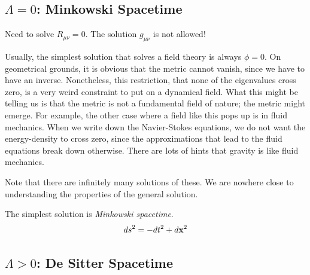 \subsection{\texorpdfstring{$\Lambda = 0$}{Zero cosmological constant}: Minkowski Spacetime}%
\label{sub:zero_cosmological_constant_minkowski_spacetime}

Need to solve $R_{\mu\nu} = 0$. The solution $g_{\mu\nu}$ is not allowed!
\begin{leftbar}
  \begin{remark}
    Usually, the simplest solution that solves a field theory is always $\phi = 0$. On geometrical grounds, it is obvious that the metric cannot vanish, since we have to have an inverse.
    Nonetheless, this restriction, that none of the eigenvalues cross zero, is a very weird constraint to put on a dynamical field.
    What this might be telling us is that the metric is not a fundamental field of nature; the metric might emerge.
    For example, the other case where a field like this pops up is in fluid mechanics.
    When we write down the Navier-Stokes equations, we do not want the energy-density to cross zero, since the approximations that lead to the fluid equations break down otherwise.
    There are lots of hints that gravity is like fluid mechanics.
  \end{remark}
  Note that there are infinitely many solutions of these. We are nowhere close to understanding the properties of the general solution.
\end{leftbar}
The simplest solution is \emph{Minkowski spacetime}.
\begin{equation}
  ds^2 = -dt^2 + d\vb{x}^2
\end{equation}

\subsection{\texorpdfstring{$\Lambda > 0$}{Positive Cosmological Constant}: De Sitter Spacetime}%
\label{sub:$lambda > 0$_positive_cosmological_constant_de_sitter_spacetime}

